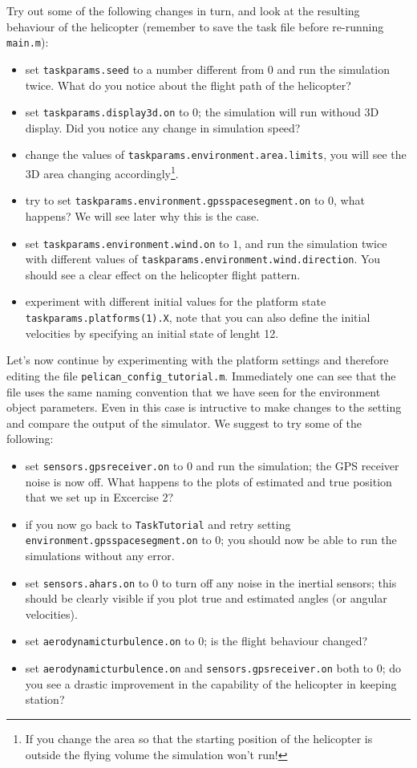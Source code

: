 \documentclass[a4paper,11pt]{article}
\begin{document}
Try out some of the following changes \textsf{in turn}, and look at the resulting behaviour of the helicopter (remember to save the task file before re-running \texttt{main.m}): 
\begin{itemize}
 \item set \texttt{taskparams.seed} to a number different from $0$ and run the simulation twice. What do you notice about the flight path of the helicopter?
 \item set \texttt{taskparams.display3d.on} to $0$; the simulation will run withoud 3D display. Did you notice any change in simulation speed?
 \item change the values of \texttt{taskparams.environment.area.limits}, you will see the 3D area changing accordingly\footnote{If you change the area so that the starting position of the helicopter is outside the flying volume the simulation won't run!}.
 \item try to set \texttt{taskparams.environment.gpsspacesegment.on} to $0$, what happens? We will see later why this is the case.
 \item set \texttt{taskparams.environment.wind.on} to $1$, and run the simulation twice with different values of \texttt{taskparams.environment.wind.direction}. You should see a clear effect on the helicopter flight pattern.
 \item experiment with different initial values for the platform state \texttt{taskparams.platforms(1).X}, note that you can also define the initial velocities by specifying an initial state of lenght 12.
\end{itemize}

Let's now continue by experimenting with the platform settings and therefore editing the file \texttt{pelican\_config\_tutorial.m}.
Immediately one can see that the file uses the same naming convention that we have seen for the environment object parameters. 
Even in this case is intructive to make changes to the setting and compare the output of the simulator. We suggest to try some of the following:
\begin{itemize}
 \item set \texttt{sensors.gpsreceiver.on} to $0$ and run the simulation; the GPS receiver noise is now off. What happens to the plots of estimated and true position that we set up in Excercise 2?
\item if you now go back to \texttt{TaskTutorial} and retry setting \texttt{environment.gpsspacesegment.on} to $0$; you should now be able to run the simulations without any error.
\item set \texttt{sensors.ahars.on} to $0$ to turn off any noise in the inertial sensors; this should be clearly visible if you plot true and estimated angles (or angular velocities). 
\item set \texttt{aerodynamicturbulence.on} to $0$; is the flight behaviour changed?
\item set \texttt{aerodynamicturbulence.on} and \texttt{sensors.gpsreceiver.on} both to $0$; do you see a drastic improvement in the capability of the helicopter in keeping station?
\end{itemize}
\end{document}
